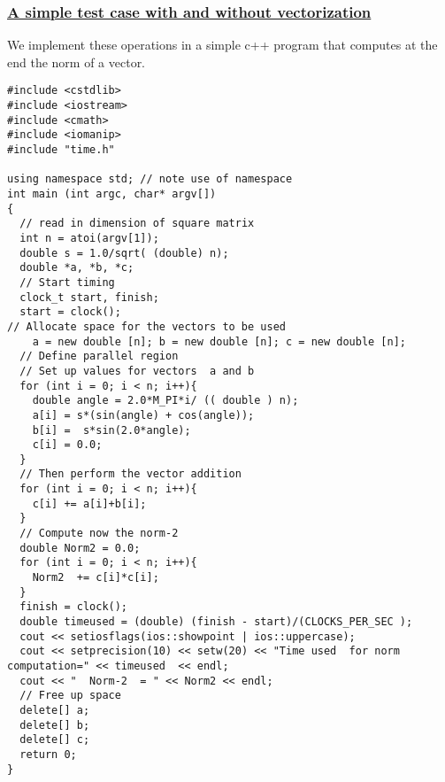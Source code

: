 \documentclass{beamer}
\begin{document}
\begin{frame}
\frametitle{\href{{https://github.com/CompPhysics/ComputationalPhysicsMSU/blob/master/doc/Programs/LecturePrograms/programs/Classes/cpp/program7.cpp}}{A simple test case with and without vectorization}}

We implement these operations in a simple c++ program that computes at the end the norm of a vector.




















































\begin{Verbatim}[numbers=none,fontsize=\fontsize{9pt}{9pt},baselinestretch=0.95]
#include <cstdlib>
#include <iostream>
#include <cmath>
#include <iomanip>
#include "time.h"

using namespace std; // note use of namespace
int main (int argc, char* argv[])
{
  // read in dimension of square matrix
  int n = atoi(argv[1]);
  double s = 1.0/sqrt( (double) n);
  double *a, *b, *c;
  // Start timing
  clock_t start, finish;
  start = clock();
// Allocate space for the vectors to be used
    a = new double [n]; b = new double [n]; c = new double [n];
  // Define parallel region
  // Set up values for vectors  a and b
  for (int i = 0; i < n; i++){
    double angle = 2.0*M_PI*i/ (( double ) n);
    a[i] = s*(sin(angle) + cos(angle));
    b[i] =  s*sin(2.0*angle);
    c[i] = 0.0;
  }
  // Then perform the vector addition
  for (int i = 0; i < n; i++){
    c[i] += a[i]+b[i];
  }
  // Compute now the norm-2
  double Norm2 = 0.0;
  for (int i = 0; i < n; i++){
    Norm2  += c[i]*c[i];
  }
  finish = clock();
  double timeused = (double) (finish - start)/(CLOCKS_PER_SEC );
  cout << setiosflags(ios::showpoint | ios::uppercase);
  cout << setprecision(10) << setw(20) << "Time used  for norm computation=" << timeused  << endl;
  cout << "  Norm-2  = " << Norm2 << endl;
  // Free up space
  delete[] a;
  delete[] b;
  delete[] c;
  return 0;
}





\end{Verbatim}
\end{frame}
\end{document}
